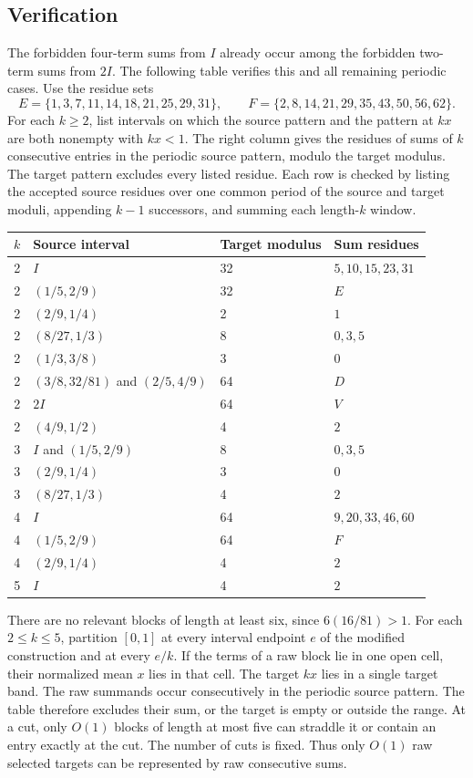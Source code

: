 \documentclass[11pt]{article}
\begin{document}
\subsection{Verification}
The forbidden four-term sums from $I$ already occur among the forbidden two-term sums from $2I$. The following table verifies this and all remaining periodic cases. Use the residue sets
\[E=\{1,3,7,11,14,18,21,25,29,31\},\qquad F=\{2,8,14,21,29,35,43,50,56,62\}.\]
For each $k\ge2$, list intervals on which the source pattern and the pattern at $kx$ are both nonempty with $kx<1$. The right column gives the residues of sums of $k$ consecutive entries in the periodic source pattern, modulo the target modulus. The target pattern excludes every listed residue. Each row is checked by listing the accepted source residues over one common period of the source and target moduli, appending $k-1$ successors, and summing each length-$k$ window.
\begin{center}\small
\begin{tabular}{rlll}
$k$ & Source interval & Target modulus & Sum residues \\ \hline
2 & $I$ &32&$5,10,15,23,31$\\
2 & $(1/5,2/9)$ &32&$E$\\
2 & $(2/9,1/4)$ &2&$1$\\
2 & $(8/27,1/3)$ &8&$0,3,5$\\
2 & $(1/3,3/8)$ &3&$0$\\
2 & $(3/8,32/81)$ and $(2/5,4/9)$ &64&$D$\\
2 & $2I$ &64&$V$\\
2 & $(4/9,1/2)$ &4&$2$\\
3 & $I$ and $(1/5,2/9)$ &8&$0,3,5$\\
3 & $(2/9,1/4)$ &3&$0$\\
3 & $(8/27,1/3)$ &4&$2$\\
4 & $I$ &64&$9,20,33,46,60$\\
4 & $(1/5,2/9)$ &64&$F$\\
4 & $(2/9,1/4)$ &4&$2$\\
5 & $I$ &4&$2$\\
\end{tabular}\end{center}

There are no relevant blocks of length at least six, since $6(16/81)>1$. For each $2\le k\le5$, partition $[0,1]$ at every interval endpoint $e$ of the modified construction and at every $e/k$. If the terms of a raw block lie in one open cell, their normalized mean $x$ lies in that cell. The target $kx$ lies in a single target band. The raw summands occur consecutively in the periodic source pattern. The table therefore excludes their sum, or the target is empty or outside the range. At a cut, only $O(1)$ blocks of length at most five can straddle it or contain an entry exactly at the cut. The number of cuts is fixed. Thus only $O(1)$ raw selected targets can be represented by raw consecutive sums.
\end{document}
